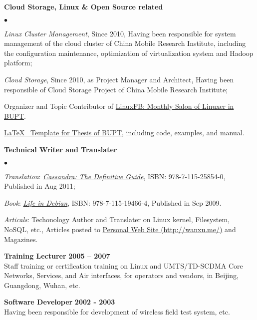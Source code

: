 \documentclass[a4paper,margin,line]{res}
\newenvironment{list2}{
  \begin{list}{$\bullet$}{%
      \setlength{\itemsep}{0in}
      \setlength{\parsep}{0in} \setlength{\parskip}{0in}
      \setlength{\topsep}{0in} \setlength{\partopsep}{0in} 
      \setlength{\leftmargin}{0.2in}}}{\end{list}}
\begin{document}
\begin{resume}
\textbf{Cloud Storage, Linux \& Open Source related}\\
\vspace*{-.1in}
\begin{list2}
\item \textit{Linux Cluster Management}, \enskip Since 2010, Having been responsible for system management of the cloud cluster of China Mobile Research Institute, including the configuration maintenance, optimization of virtualization system and Hadoop platform;
\item \textit{Cloud Storage}, \enskip Since 2010, as Project Manager and Architect, Having been responsible of Cloud Storage Project of China Mobile Research Institute;
\item Organizer and Topic Contributor of \href{http://linuxfb.org}{LinuxFB: Monthly Salon of Linuxer in BUPT}.
\item \href{http://code.google.com/p/latex-bupt}{\LaTeX\mbox{ } Template for Thesis of BUPT}, including code, examples, and manual. 
\end{list2}

\textbf{Technical Writer and Translater}\\
\begin{list2}
\item \textit{Translation}\/: \href{http://wangxu.me/works/2011/04/25/cassandra-definitive-guide}{\textit{Cassandra: The Definitive Guide}}\/, ISBN: 978-7-115-25854-0, Published in Aug 2011;
\item \textit{Book}\/: \href{http://wangxu.me/2009/09/17/\%E6\%88\%91\%E7\%9A\%84\%E4\%B9\%A6\%E7\%9A\%84\%E9\%82\%A3\%E4\%BA\%9B\%E4\%BA\%8B/}{\textit{Life in Debian}}, ISBN: 978-7-115-19466-4, Published in Sep 2009. 
\item \textit{Articals}\/: Techonology Author and Translater on Linux kernel, Filesystem, NoSQL, etc., Articles posted to \href{http://wangxu.me/}{Personal Web Site (http:/$\!$/wanxu.me/)} and Magazines.
\end{list2}

{\bf Training Lecturer} \hfill {\bf 2005 -- 2007}\\
Staff training or certification training on Linux and UMTS/TD-SCDMA Core Networks, Services, and Air interfaces, for operators and vendors, in Beijing, Guangdong, Wuhan, etc.

{\bf Software Developer} \hfill {\bf 2002 - 2003}\\
Having been responsible for development of wireless field test system, etc.


\end{resume}
\end{document}
